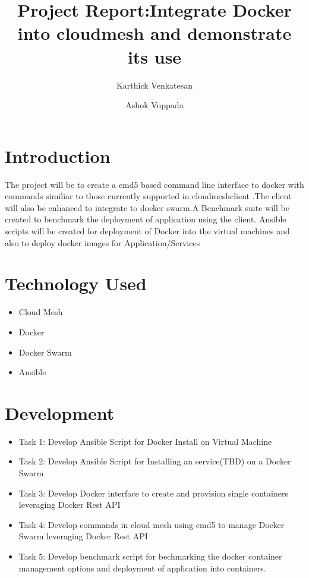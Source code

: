 \documentclass[9pt,twocolumn,twoside]{styles/osajnl}
\title{Project Report:Integrate Docker  into cloudmesh and demonstrate its use}
\author[1]{Karthick Venkatesan}
\author[1]{Ashok Vuppada}
\affil[1]{School of Informatics and Computing, Bloomington, IN 47408, U.S.A.}
\begin{document}
\maketitle

\section{Introduction}

The project will be to create a cmd5 based command line interface to docker with commands similiar to those currently supported in cloudmeshclient .The client will also be enhanced to integrate  to docker swarm.A Benchmark suite will be created to benchmark the deployment of application using the client.
Ansible scripts will be created for deployment of Docker into the virtual machines and also to deploy docker images  for Application/Services

\section{Technology Used}

\renewcommand{\labelitemi}{\scriptsize$\square$} 

\begin{itemize}
\item Cloud Mesh
\item Docker
\item Docker Swarm
\item Ansible
\end{itemize}

\section{Development}

\renewcommand{\labelitemi}{\scriptsize$\square$} 

\begin{itemize}
\item Task 1: Develop Ansible Script for Docker Install on Virtual Machine
 
\item Task 2: Develop Ansible Script for Installing an service(TBD) on a Docker Swarm 

\item Task 3: Develop Docker interface to create and provision single containers leveraging Docker Rest API

\item Task 4: Develop commands in cloud mesh using cmd5 to manage Docker Swarm leveraging Docker Rest API

\item Task 5: Develop benchmark script for bechmarking the docker container management options and deployment of application into containers.
\end{itemize}
\end{document}
